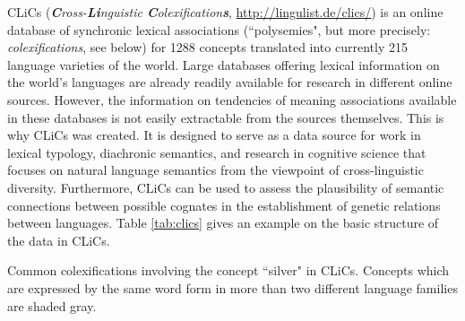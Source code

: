 CLiCs (\emph{\textbf{C}ross-\textbf{Li}nguistic \textbf{C}olexification\textbf{s}},
\url{http://lingulist.de/clics/}) is an online
database of synchronic lexical associations (``polysemies", but more precisely:
\emph{colexifications}, see below) for 1288 concepts translated into currently 215 language varieties of the world. 
Large databases offering lexical
information on the world's languages are already readily available for research in different online
sources. However, the information on tendencies of meaning associations available in these databases
is not easily extractable from the sources themselves. This is why CLiCs was created.  
It is designed
to serve as a data source for work in lexical typology, diachronic semantics, and research in
cognitive science that focuses on natural language semantics from the viewpoint of cross-linguistic
diversity. Furthermore, CLiCs can be used to assess the plausibility of semantic
connections between possible cognates in the establishment of genetic relations between languages.
Table \ref{tab:clics} gives an example on the basic structure of the data in CLiCs. 
 
\begin{table}[b]
    \centering
{}
\caption{Common colexifications involving the concept ``silver" in CLiCs. Concepts which are
expressed by the same word form in more than two different language families are shaded gray.}
\label{tab:clics}
\end{table}


